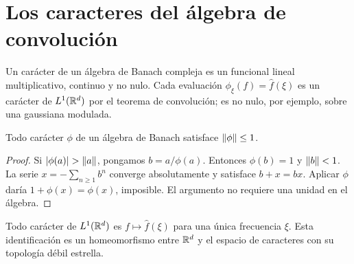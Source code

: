 \section{Los caracteres del álgebra de convolución}\label{lectura:v4-12}
Un carácter de un álgebra de Banach compleja es un funcional lineal multiplicativo, continuo y no nulo. Cada evaluación $\phi_\xi(f)=\widehat f(\xi)$ es un carácter de $L^1(\mathbb R^d)$ por el teorema de convolución; es no nulo, por ejemplo, sobre una gaussiana modulada.
\begin{lema}
Todo carácter $\phi$ de un álgebra de Banach satisface $\left\lVert\phi\right\rVert\leq1$.
\end{lema}
\begin{proof}
Si $|\phi(a)|>\norm a$, pongamos $b=a/\phi(a)$. Entonces $\phi(b)=1$ y $\left\lVert b\right\rVert<1$. La serie $x=-\sum_{n\geq1}b^n$ converge absolutamente y satisface $b+x=bx$. Aplicar $\phi$ daría $1+\phi(x)=\phi(x)$, imposible. El argumento no requiere una unidad en el álgebra.
\end{proof}
\begin{teorema}\label{v4:caracteres-L1R}
Todo carácter de $L^1(\mathbb R^d)$ es $f\mapsto\widehat f(\xi)$ para una única frecuencia $\xi$. Esta identificación es un homeomorfismo entre $\mathbb R^d$ y el espacio de caracteres con su topología débil estrella.
\end{teorema}

